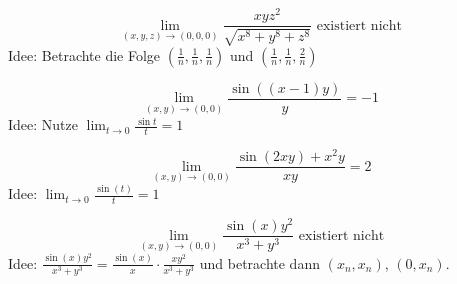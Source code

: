 \begin{displaymath}
  \lim_{(x,y,z) \to (0,0,0)} \frac{xyz^2}{\sqrt{x^8 + y^8 + z^8}} \text{ existiert nicht}
\end{displaymath}
Idee: Betrachte die Folge $\left(\frac{1}{n}, \frac{1}{n}, \frac{1}{n}\right)$ und $\left(\frac{1}{n}, \frac{1}{n}, \frac{2}{n}\right)$

\begin{displaymath}
  \lim_{(x,y) \to (0,0)} \frac{\sin((x-1)y)}{y} = -1
\end{displaymath}
Idee: Nutze $\lim_{t \to 0} \frac{\sin t}{t} = 1$

\begin{displaymath}
  \lim_{(x,y) \to (0,0)} \frac{\sin(2xy) + x^2y}{xy} = 2
\end{displaymath}
Idee: $\lim_{t \to 0} \frac{\sin(t)}{t} = 1$

\begin{displaymath}
  \lim_{(x,y) \to (0,0)} \frac{\sin(x)y^2}{x^3 + y^3} \text{ existiert nicht}
\end{displaymath}
Idee: $\frac{\sin(x)y^2}{x^3 + y^3} = \frac{\sin(x)}{x} \cdot \frac{xy^2}{x^3 + y^3}$ und betrachte dann $(x_n, x_n)$, $(0, x_n)$.